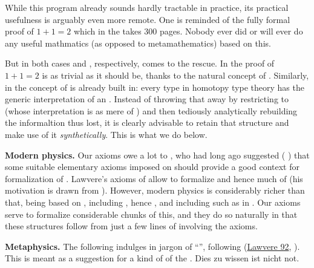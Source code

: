 \documentclass[12pt,titlepage]{article}
\theoremstyle{plain}
\theoremstyle{definition}
\theoremstyle{remark}
\begin{document}
While this program already sounds hardly tractable in practice, its practical usefulness is arguably even more remote. One is reminded of the fully formal proof of $1+1 = 2$ which in the  takes 300 pages. Nobody ever did or will ever do any useful mathmatics (as opposed to metamathematics) based on this.

But in both cases  and , respectively, comes to the rescue. In  the proof of $1+1 = 2$ is as trivial as it should be, thanks to the natural concept of . Similarly, in  the concept of  is already built in: every type in homotopy type theory has the generic interpretation of an . Instead of throwing that away by restricting to  (whose interpretation is as mere  of ) and then tediously analytically rebuilding the informaltion thus lost, it is clearly advisable to retain that structure and make use of it \emph{synthetically}. This is what we do below.

\textbf{Modern physics.} Our axioms owe a lot to , who had long ago suggested (  ) that some suitable elementary axioms imposed on  should provide a good context for formalization of . Lawvere's axioms of  allow to formalize  and hence much of  (his motivation is drawn from ). However, modern physics is considerably richer than that, being based on    , including , hence , and including  such as  in . Our axioms serve to formalize considerable chunks of this, and they do so naturally in that these structures follow from just a few lines of  involving the axioms.

\textbf{Metaphysics.} The following indulges in  jargon of ``'', following (\href{http://ncatlab.org/nlab/show/objective+and+subjective+logic#Lawvere92}{Lawvere 92}, ). This is meant as a suggestion for a kind of  of the . Dies zu wissen ist nicht not.
\end{document}

